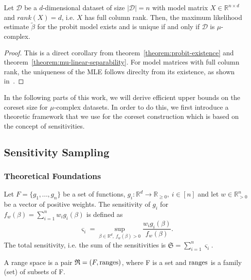 \begin{theorem}
    Let $\mathcal{D}$ be a $d$-dimensional dataset of size
    $|\mathcal{D}| = n$ with model matrix $X \in \mathbb{R}^{n \times d}$
    and $rank(X) = d$, i.e. $X$ has full column rank.
    Then, the maximum likelihood estimate $\tilde\beta$ for the probit
    model exists and is unique if and only if $\mathcal{D}$ is $\mu$-complex.
\end{theorem}
\begin{proof}
    This is a direct corollary from theorem~\ref{theorem:probit-existence}
    and theorem~\ref{theorem:mu-linear-separability}.
    For model matrices with full column rank, the uniqueness of the
    MLE follows
    direclty from its existence, as shown in~\cite{wedderburn}.
\end{proof}

In the following parts of this work, we will derive efficient upper
bounds on the coreset size for $\mu$-complex datasets.
In order to do this, we first introduce a theoretic
framework that we use for the coreset construction which
is based on the concept of sensitivities.

\subsection{Sensitivity Sampling}

\subsubsection{Theoretical Foundations}

\begin{definition}
    \label{def:sensitivity}
    Let $F = \{ g_1, ..., g_n \}$ be a set of functions,
    $g_i: \mathbb{R}^d \rightarrow \mathbb{R}_{\geq 0}, \ i \in [n]$
    and let $w \in \mathbb{R}^n_{>0}$ be a vector of positive weights.
    The sensitivity of $g_i$ for $f_w(\beta) = \sum_{i=1}^n w_i g_i(\beta)$ is defined as
    \begin{equation*}
        \varsigma_i = \sup_{\beta \in \mathbb{R}^d, \ f_w(\beta) > 0} \frac{w_i g_i(\beta)}{f_w(\beta)}.
    \end{equation*}
    The total sensitivity, i.e. the sum of the sensitivities is $\mathfrak{S} = \sum_{i=1}^n \varsigma_i$.
\end{definition}

\begin{definition}
    A range space is a pair $\mathfrak{R} = (F, \textup{ranges})$, where F is a set
    and $\textup{ranges}$ is a family (set) of subsets of F.
\end{definition}

